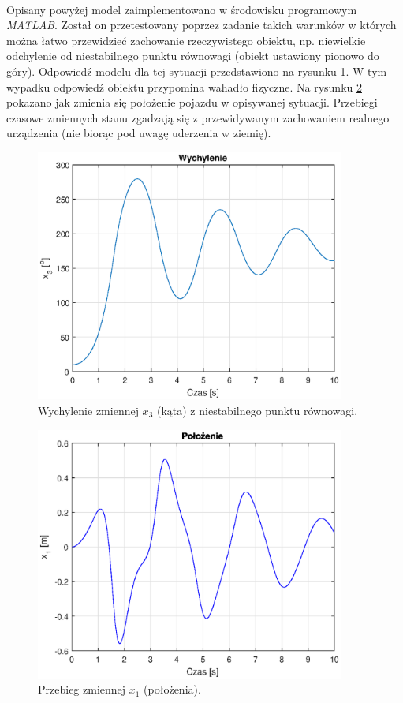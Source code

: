 \paragraph*{}
Opisany powyżej model zaimplementowano w środowisku programowym \textit{MATLAB}. Został on przetestowany poprzez zadanie takich warunków w których można łatwo przewidzieć zachowanie rzeczywistego obiektu, np. niewielkie odchylenie od niestabilnego punktu równowagi (obiekt ustawiony pionowo do góry). Odpowiedź modelu dla tej sytuacji przedstawiono na rysunku \ref{fig:wychylenie_test}. W tym wypadku odpowiedź obiektu przypomina wahadło fizyczne. Na rysunku \ref{fig:polozenie_test} pokazano jak zmienia się położenie pojazdu w opisywanej sytuacji. Przebiegi czasowe zmiennych stanu zgadzają się z przewidywanym zachowaniem realnego urządzenia (nie biorąc pod uwagę uderzenia w ziemię).
\newpage
\begin{figure}[h]
	\centering
	\includegraphics[width=4in]{Figures/wychylenie_test.eps}
	\caption{Wychylenie zmiennej \(x_3\) (kąta) z niestabilnego punktu równowagi.}
	\label{fig:wychylenie_test}
\end{figure}

\begin{figure}[H]
	\centering
	\includegraphics[width=4in]{Figures/polozenie_test.eps}
	\caption{Przebieg zmiennej \(x_1\) (położenia).}
	\label{fig:polozenie_test}
\end{figure}

